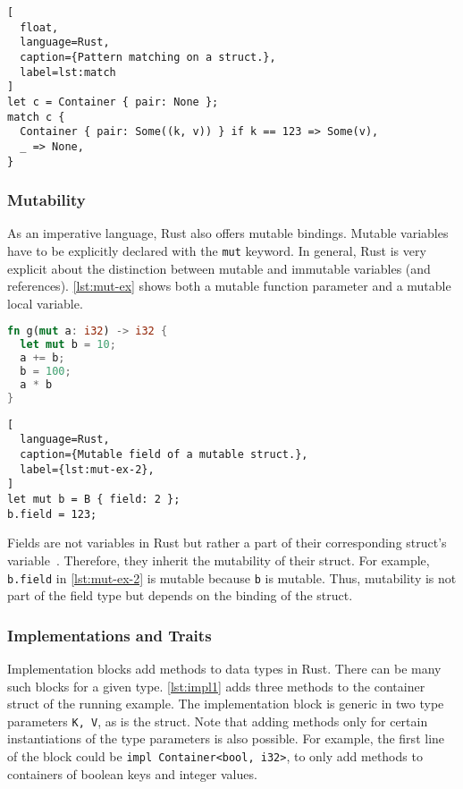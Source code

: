 \begin{lstlisting}[
  float,
  language=Rust,
  caption={Pattern matching on a struct.},
  label=lst:match
]
let c = Container { pair: None };
match c {
  Container { pair: Some((k, v)) } if k == 123 => Some(v),
  _ => None,
}
\end{lstlisting}

\subsubsection{Mutability}

As an imperative language, Rust also offers mutable bindings. Mutable variables
have to be explicitly declared with the \lstinline!mut! keyword. In general,
Rust is very explicit about the distinction between mutable and immutable
variables (and references). \autoref{lst:mut-ex} shows both a mutable function
parameter and a mutable local variable.

\noindent\begin{minipage}[t]{.48\textwidth}
\begin{lstlisting}[language=Rust, caption={Mutable variable bindings.}, label=lst:mut-ex]
fn g(mut a: i32) -> i32 {
  let mut b = 10;
  a += b;
  b = 100;
  a * b
}
\end{lstlisting}
\end{minipage}\hfill
\begin{minipage}[t]{.48\textwidth}
\begin{lstlisting}[
  language=Rust,
  caption={Mutable field of a mutable struct.},
  label={lst:mut-ex-2},
]
let mut b = B { field: 2 };
b.field = 123;
\end{lstlisting}
\end{minipage}

Fields are not variables in Rust but rather a part of their corresponding
struct's variable~\cite{rustref}. Therefore, they inherit the mutability of
their struct. For example, \lstinline!b.field! in \autoref{lst:mut-ex-2} is
mutable because \lstinline!b! is mutable. Thus, mutability is not
part of the field type but depends on the binding of the struct.

\subsubsection{Implementations and Traits}

Implementation blocks add methods to data types in Rust. There can be many such
blocks for a given type. \autoref{lst:impl1} adds three methods to the container
struct of the running example. The implementation block is generic in two type
parameters \passthrough{\lstinline!K, V!}, as is the struct. Note that adding
methods only for certain instantiations of the  type parameters is also
possible. For example, the first line of the block could be
\passthrough{\lstinline!impl Container<bool, i32>!}, to only add methods to
containers of boolean keys and integer values.

